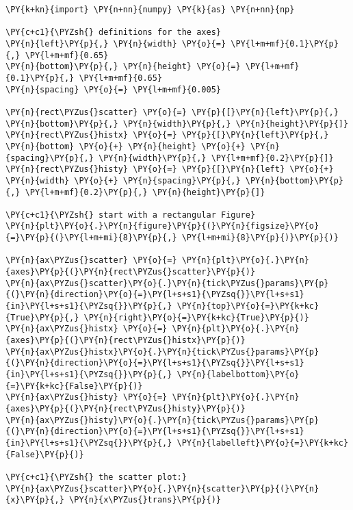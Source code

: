     \begin{tcolorbox}[breakable, size=fbox, boxrule=1pt, pad at break*=1mm,colback=cellbackground, colframe=cellborder]
\begin{Verbatim}[commandchars=\\\{\}]
\PY{k+kn}{import} \PY{n+nn}{numpy} \PY{k}{as} \PY{n+nn}{np}

\PY{c+c1}{\PYZsh{} definitions for the axes}
\PY{n}{left}\PY{p}{,} \PY{n}{width} \PY{o}{=} \PY{l+m+mf}{0.1}\PY{p}{,} \PY{l+m+mf}{0.65}
\PY{n}{bottom}\PY{p}{,} \PY{n}{height} \PY{o}{=} \PY{l+m+mf}{0.1}\PY{p}{,} \PY{l+m+mf}{0.65}
\PY{n}{spacing} \PY{o}{=} \PY{l+m+mf}{0.005}

\PY{n}{rect\PYZus{}scatter} \PY{o}{=} \PY{p}{[}\PY{n}{left}\PY{p}{,} \PY{n}{bottom}\PY{p}{,} \PY{n}{width}\PY{p}{,} \PY{n}{height}\PY{p}{]}
\PY{n}{rect\PYZus{}histx} \PY{o}{=} \PY{p}{[}\PY{n}{left}\PY{p}{,} \PY{n}{bottom} \PY{o}{+} \PY{n}{height} \PY{o}{+} \PY{n}{spacing}\PY{p}{,} \PY{n}{width}\PY{p}{,} \PY{l+m+mf}{0.2}\PY{p}{]}
\PY{n}{rect\PYZus{}histy} \PY{o}{=} \PY{p}{[}\PY{n}{left} \PY{o}{+} \PY{n}{width} \PY{o}{+} \PY{n}{spacing}\PY{p}{,} \PY{n}{bottom}\PY{p}{,} \PY{l+m+mf}{0.2}\PY{p}{,} \PY{n}{height}\PY{p}{]}

\PY{c+c1}{\PYZsh{} start with a rectangular Figure}
\PY{n}{plt}\PY{o}{.}\PY{n}{figure}\PY{p}{(}\PY{n}{figsize}\PY{o}{=}\PY{p}{(}\PY{l+m+mi}{8}\PY{p}{,} \PY{l+m+mi}{8}\PY{p}{)}\PY{p}{)}

\PY{n}{ax\PYZus{}scatter} \PY{o}{=} \PY{n}{plt}\PY{o}{.}\PY{n}{axes}\PY{p}{(}\PY{n}{rect\PYZus{}scatter}\PY{p}{)}
\PY{n}{ax\PYZus{}scatter}\PY{o}{.}\PY{n}{tick\PYZus{}params}\PY{p}{(}\PY{n}{direction}\PY{o}{=}\PY{l+s+s1}{\PYZsq{}}\PY{l+s+s1}{in}\PY{l+s+s1}{\PYZsq{}}\PY{p}{,} \PY{n}{top}\PY{o}{=}\PY{k+kc}{True}\PY{p}{,} \PY{n}{right}\PY{o}{=}\PY{k+kc}{True}\PY{p}{)}
\PY{n}{ax\PYZus{}histx} \PY{o}{=} \PY{n}{plt}\PY{o}{.}\PY{n}{axes}\PY{p}{(}\PY{n}{rect\PYZus{}histx}\PY{p}{)}
\PY{n}{ax\PYZus{}histx}\PY{o}{.}\PY{n}{tick\PYZus{}params}\PY{p}{(}\PY{n}{direction}\PY{o}{=}\PY{l+s+s1}{\PYZsq{}}\PY{l+s+s1}{in}\PY{l+s+s1}{\PYZsq{}}\PY{p}{,} \PY{n}{labelbottom}\PY{o}{=}\PY{k+kc}{False}\PY{p}{)}
\PY{n}{ax\PYZus{}histy} \PY{o}{=} \PY{n}{plt}\PY{o}{.}\PY{n}{axes}\PY{p}{(}\PY{n}{rect\PYZus{}histy}\PY{p}{)}
\PY{n}{ax\PYZus{}histy}\PY{o}{.}\PY{n}{tick\PYZus{}params}\PY{p}{(}\PY{n}{direction}\PY{o}{=}\PY{l+s+s1}{\PYZsq{}}\PY{l+s+s1}{in}\PY{l+s+s1}{\PYZsq{}}\PY{p}{,} \PY{n}{labelleft}\PY{o}{=}\PY{k+kc}{False}\PY{p}{)}

\PY{c+c1}{\PYZsh{} the scatter plot:}
\PY{n}{ax\PYZus{}scatter}\PY{o}{.}\PY{n}{scatter}\PY{p}{(}\PY{n}{x}\PY{p}{,} \PY{n}{x\PYZus{}trans}\PY{p}{)}


\end{Verbatim}
\end{tcolorbox}
